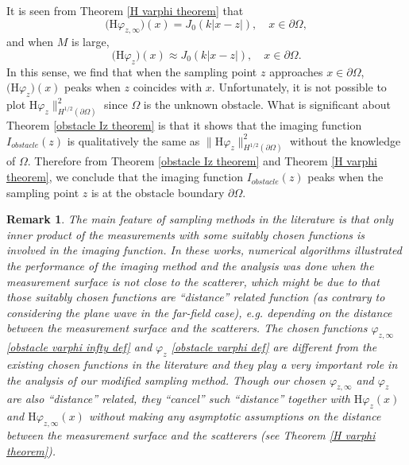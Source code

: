 \documentclass[final]{siamltex}
\newtheorem{remark}{Remark}
\begin{document}
It is seen from Theorem \ref{H varphi theorem} that
\begin{equation}
\Big( \mathrm{H} \varphi_{z,\infty} \Big) (x) = J_0(k|x-z|),
\quad x\in \partial \Omega,
\end{equation}
and when $M$ is large,
\begin{equation}
\Big( \mathrm{H} \varphi_z \Big) (x) \approx
J_0(k|x-z|),
\quad x\in \partial \Omega.
\end{equation}
In this sense, we find that when the sampling point $z$ approaches $x \in \partial \Omega$, $\big(\mathrm{H} \varphi_z \big)(x)$ peaks  when $z$ coincides with $x$.
Unfortunately, it is not possible to plot  $\mathrm{H} \varphi_z\|^2_{H^{1/2}(\partial \Omega)}$ since $\Omega$ is the unknown obstacle. What is significant about Theorem \ref{obstacle Iz theorem} is that it shows that the imaging function $I_{obstacle}(z)$ is qualitatively the same as $\|  \mathrm{H} \varphi_z\|^2_{H^{1/2}(\partial \Omega)}$ without the knowledge of $\Omega$.  
Therefore from Theorem \ref{obstacle Iz theorem} and Theorem \ref{H varphi theorem}, we  conclude that  the imaging function $I_{obstacle}(z)$ peaks  when the  sampling point $z$ is at the obstacle boundary $\partial \Omega$.

\begin{remark}
The main feature of sampling methods in the literature \cite{CCH2013,ItoJinZou} is that only inner product of the measurements with some suitably chosen functions is involved in the imaging function. In these works, numerical algorithms illustrated the performance of the imaging method and the analysis was done when the measurement surface is not close to the scatterer, which might be due to that those suitably chosen functions are ``distance'' related function (as contrary to considering the plane wave in the far-field case), e.g. depending on the distance between the measurement surface and the scatterers. The chosen functions $\varphi_{z,\infty}$  \eqref{obstacle varphi infty def} and $\varphi_{z}$  \eqref{obstacle varphi def} are different from the existing chosen functions in the literature \cite{CCH2013,ItoJinZou} and they play a very important role in the analysis of our modified sampling method. Though our chosen $\varphi_{z,\infty}$  and $\varphi_{z}$ are also ``distance'' related, they ``cancel'' such ``distance'' together with $\mathrm{H} \varphi_z (x)$ and $\mathrm{H} \varphi_{z,\infty} (x)$ without making any asymptotic assumptions on the distance between the measurement surface and the scatterers (see Theorem \ref{H varphi theorem}).
\end{remark}
\end{document}
